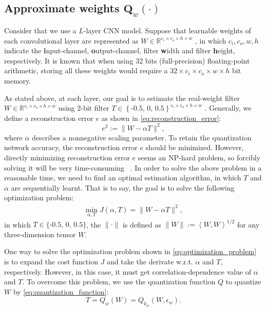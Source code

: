\documentclass[twoside,twocolumn]{article}
\begin{document}
\subsection{Approximate weights  $\boldsymbol{Q}_w\left( \cdot \right)$}
Consider that we use a $L$-layer CNN model. Suppose that learnable weights of each convolutional layer are represented as $W\in \mathbb{R}^{c_i\times c_o\times h\times w}$ , in which $c_i,c_o,w,h$ indicate the \textbf{i}nput-channel, \textbf{o}utput-channel, filter \textbf{w}idth and filter \textbf{h}eight, respectively. It is known that when using 32 bits (full-precision) floating-point arithmetic, storing all these weights would require a $32\times c_i\times c_o\times w\times h$ bit memory.

As stated above, at each layer, our goal is to estimate the real-weight filter $W\in \mathbb{R}^{c_i\times c_o\times h\times w}$ using 2-bit filter $T\in \left\{ \text{-0.5,\ 0,\ 0.5} \right\} ^{c_i\times c_o\times h\times w}$ . Generally, we define a reconstruction error $e$ as shown in \eqref{eq:reconstruction_error}:
\begin{equation}\label{eq:reconstruction_error}
e^2:=\lVert W-\alpha T \rVert ^2,
\end{equation}
where $\alpha$ describes a nonnegative scaling parameter. To retain the quantization network accuracy, the reconstruction error $e$ should be minimized. However, directly minimizing reconstruction error $e$ seems an NP-hard problem, so forcibly solving it will be very time-consuming ~\cite{b42}. In order to solve the above problem in a reasonable time, we need to find an optimal estimation algorithm, in which $T$ and $\alpha$ are sequentially learnt. That is to say, the goal is to solve the following optimization problem:
\begin{equation}\label{eq:optimization_problem}
\begin{aligned}
\underset{\alpha ,T}{\min}J\left( \alpha ,T \right) =\lVert W-\alpha T \rVert ^2,
\end{aligned}
\end{equation}
in which $T\in\text{\{-0.5,\ 0,\ 0.5\}}$, the $\lVert\cdot\rVert$ is defined as $\lVert W \rVert :=\left< W,W \right> ^{\text{1/}2}$ for any three-dimension tensor $W$.

One way to solve the optimization problem shown in \eqref{eq:optimization_problem} is to expand the cost function $J$ and take the derivate w.r.t. $\alpha$ and $T$, respectively. However, in this case, it must get correlation-dependence value of $\alpha$ and $T$. To overcome this problem, we use the quantization function $Q$ to quantize $W$ by \eqref{eq:quantization_function}:
\begin{equation}\label{eq:quantization_weight}
T=Q_w\left( W \right) =Q_{k_w}\left( W,\epsilon _w \right).
\end{equation}
\end{document}
